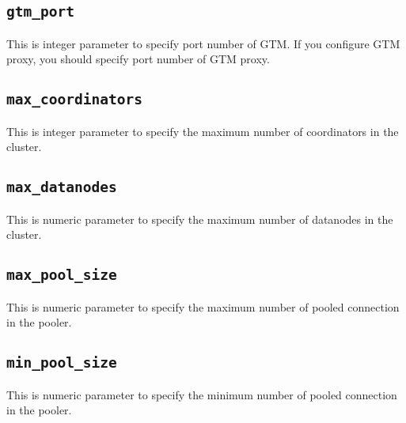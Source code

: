 
\subsection*{\label{subsec:gtmPort}\texttt{gtm\_port}}

  This is integer parameter to specify port number of GTM.
  If you configure GTM proxy, you should specify port number of GTM proxy.



\subsection*{\label{subsec:maxCoordinators}\texttt{max\_coordinators}}

  This is integer parameter to specify the maximum number of coordinators in the cluster.



\subsection*{\label{subsec:maxDatanodes}\texttt{max\_datanodes}}

  This is numeric parameter to specify the maximum number of datanodes in the cluster.



\subsection*{\label{subsec:maxPoolSize}\texttt{max\_pool\_size}}

  This is numeric parameter to specify the maximum number of pooled connection in the pooler.



\subsection*{\label{subsec:minPoolSize}\texttt{min\_pool\_size}}

  This is numeric parameter to specify the minimum number of pooled connection in the pooler.


